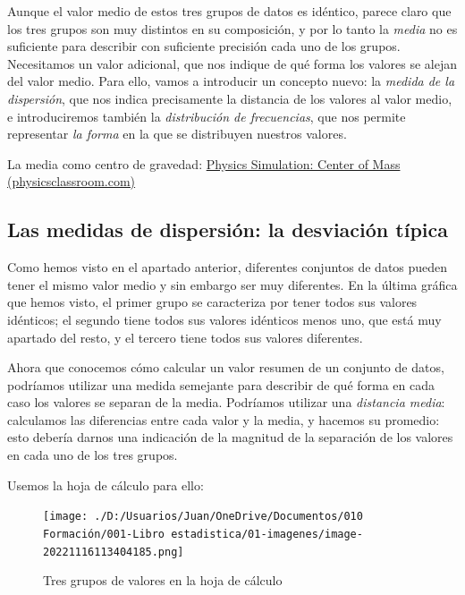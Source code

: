 \documentclass[
  letterpaper,
]{scrbook}
\begin{document}
Aunque el valor medio de estos tres grupos de datos es idéntico, parece
claro que los tres grupos son muy distintos en su composición, y por lo
tanto la \emph{media} no es suficiente para describir con suficiente
precisión cada uno de los grupos. Necesitamos un valor adicional, que
nos indique de qué forma los valores se alejan del valor medio. Para
ello, vamos a introducir un concepto nuevo: la \emph{medida de la
dispersión}, que nos indica precisamente la distancia de los valores al
valor medio, e introduciremos también la \emph{distribución de
frecuencias}, que nos permite representar \emph{la forma} en la que se
distribuyen nuestros valores.

La media como centro de gravedad:
\href{https://www.physicsclassroom.com/Physics-Interactives/Balance-and-Rotation/COM-Builder/Center-Of-Mass-Interactive}{Physics
Simulation: Center of Mass (physicsclassroom.com)}

\hypertarget{las-medidas-de-dispersiuxf3n-la-desviaciuxf3n-tuxedpica}{%
\subsection{Las medidas de dispersión: la desviación
típica}\label{las-medidas-de-dispersiuxf3n-la-desviaciuxf3n-tuxedpica}}

Como hemos visto en el apartado anterior, diferentes conjuntos de datos
pueden tener el mismo valor medio y sin embargo ser muy diferentes. En
la última gráfica que hemos visto, el primer grupo se caracteriza por
tener todos sus valores idénticos; el segundo tiene todos sus valores
idénticos menos uno, que está muy apartado del resto, y el tercero tiene
todos sus valores diferentes.

Ahora que conocemos cómo calcular un valor resumen de un conjunto de
datos, podríamos utilizar una medida semejante para describir de qué
forma en cada caso los valores se separan de la media. Podríamos
utilizar una \emph{distancia media}: calculamos las diferencias entre
cada valor y la media, y hacemos su promedio: esto debería darnos una
indicación de la magnitud de la separación de los valores en cada uno de
los tres grupos.

Usemos la hoja de cálculo para ello:

\begin{figure}

{\centering \texttt{[image: ./D:/Usuarios/Juan/OneDrive/Documentos/010 Formación/001-Libro estadistica/01-imagenes/image-20221116113404185.png]}

}

\caption{Tres grupos de valores en la hoja de cálculo}

\end{figure}
\end{document}
